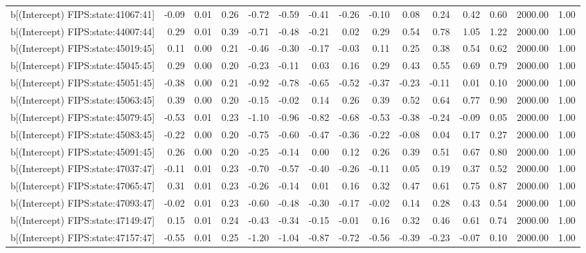 \begin{table}[ht]
\begin{tabular}{rrrrrrrrrrrrrrr}
  b[(Intercept) FIPS:state:41067:41] & -0.09 & 0.01 & 0.26 & -0.72 & -0.59 & -0.41 & -0.26 & -0.10 & 0.08 & 0.24 & 0.42 & 0.60 & 2000.00 & 1.00 \\ 
  b[(Intercept) FIPS:state:44007:44] & 0.29 & 0.01 & 0.39 & -0.71 & -0.48 & -0.21 & 0.02 & 0.29 & 0.54 & 0.78 & 1.05 & 1.22 & 2000.00 & 1.00 \\ 
  b[(Intercept) FIPS:state:45019:45] & 0.11 & 0.00 & 0.21 & -0.46 & -0.30 & -0.17 & -0.03 & 0.11 & 0.25 & 0.38 & 0.54 & 0.62 & 2000.00 & 1.00 \\ 
  b[(Intercept) FIPS:state:45045:45] & 0.29 & 0.00 & 0.20 & -0.23 & -0.11 & 0.03 & 0.16 & 0.29 & 0.43 & 0.55 & 0.69 & 0.79 & 2000.00 & 1.00 \\ 
  b[(Intercept) FIPS:state:45051:45] & -0.38 & 0.00 & 0.21 & -0.92 & -0.78 & -0.65 & -0.52 & -0.37 & -0.23 & -0.11 & 0.01 & 0.10 & 2000.00 & 1.00 \\ 
  b[(Intercept) FIPS:state:45063:45] & 0.39 & 0.00 & 0.20 & -0.15 & -0.02 & 0.14 & 0.26 & 0.39 & 0.52 & 0.64 & 0.77 & 0.90 & 2000.00 & 1.00 \\ 
  b[(Intercept) FIPS:state:45079:45] & -0.53 & 0.01 & 0.23 & -1.10 & -0.96 & -0.82 & -0.68 & -0.53 & -0.38 & -0.24 & -0.09 & 0.05 & 2000.00 & 1.00 \\ 
  b[(Intercept) FIPS:state:45083:45] & -0.22 & 0.00 & 0.20 & -0.75 & -0.60 & -0.47 & -0.36 & -0.22 & -0.08 & 0.04 & 0.17 & 0.27 & 2000.00 & 1.00 \\ 
  b[(Intercept) FIPS:state:45091:45] & 0.26 & 0.00 & 0.20 & -0.25 & -0.14 & 0.00 & 0.12 & 0.26 & 0.39 & 0.51 & 0.67 & 0.80 & 2000.00 & 1.00 \\ 
  b[(Intercept) FIPS:state:47037:47] & -0.11 & 0.01 & 0.23 & -0.70 & -0.57 & -0.40 & -0.26 & -0.11 & 0.05 & 0.19 & 0.37 & 0.52 & 2000.00 & 1.00 \\ 
  b[(Intercept) FIPS:state:47065:47] & 0.31 & 0.01 & 0.23 & -0.26 & -0.14 & 0.01 & 0.16 & 0.32 & 0.47 & 0.61 & 0.75 & 0.87 & 2000.00 & 1.00 \\ 
  b[(Intercept) FIPS:state:47093:47] & -0.02 & 0.01 & 0.23 & -0.60 & -0.48 & -0.30 & -0.17 & -0.02 & 0.14 & 0.28 & 0.43 & 0.54 & 2000.00 & 1.00 \\ 
  b[(Intercept) FIPS:state:47149:47] & 0.15 & 0.01 & 0.24 & -0.43 & -0.34 & -0.15 & -0.01 & 0.16 & 0.32 & 0.46 & 0.61 & 0.74 & 2000.00 & 1.00 \\ 
  b[(Intercept) FIPS:state:47157:47] & -0.55 & 0.01 & 0.25 & -1.20 & -1.04 & -0.87 & -0.72 & -0.56 & -0.39 & -0.23 & -0.07 & 0.10 & 2000.00 & 1.00 \\ 

\end{tabular}
\end{table}

